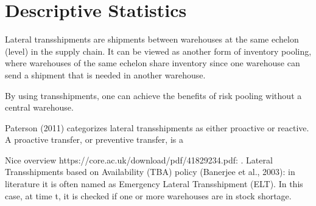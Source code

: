 \documentclass[../../main.tex]{subfiles}
\begin{document}

\section{Descriptive Statistics}

Lateral transshipments are shipments between warehouses at the same echelon (level) in the supply chain. It can be viewed as another form of inventory pooling, where warehouses of the same echelon share inventory since one warehouse can send a shipment that is needed in another warehouse. 

By using transshipments, one can achieve the benefits of risk pooling without a central warehouse.

Paterson (2011) categorizes lateral transshipments as either proactive or reactive. A proactive transfer, or preventive transfer, is a 

Nice overview https://core.ac.uk/download/pdf/41829234.pdf:
. Lateral Transshipments based on Availability (TBA) policy (Banerjee et al., 2003): in literature it is often named as Emergency Lateral Transshipment (ELT). In this case, at time t, it is checked if one or more warehouses are in stock shortage. 

\end{document}
